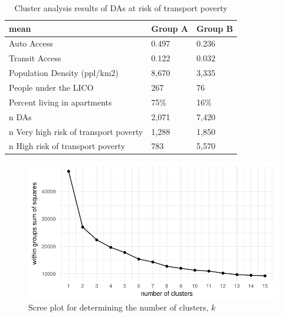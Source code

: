 \documentclass[11 pt, letterpaper]{article}
\begin{document}
{\begin{table}[H]
	\vspace{4mm}
	\centering
	\renewcommand{\arraystretch}{0.75} %
	\caption{Cluster analysis results of DAs at risk of transport poverty}
	\label{t_cluster}
	\begin{tabular}{l|ll}
		mean & Group A & Group B \\ \hline

		Auto Access               & 0.497   & 0.236   \\
		Transit Access                  & 0.122   & 0.032   \\
		Population Density (ppl/km2)          & 8,670    & 3,335    \\
		People under the LICO        & 267     & 76      \\
		Percent living in apartments & 75\%    & 16\%   \\ \hline
				n DAs                         & 2,071    & 7,420  \\
				n Very high risk of transport poverty &  1,288 & 1,850 \\
				n High risk of transport poverty & 783 & 5,570 
	\end{tabular}
\end{table}

\begin{figure}[H]
	\vspace{1mm}
	\caption{Scree plot for determining the number of clusters, $k$} 
	\label{scree_plot}
	\centerline{\includegraphics[width=5.5in]{figures/built_env/scree_plot.pdf}}
	\vspace{2mm}
\end{figure}

}
\end{document}
